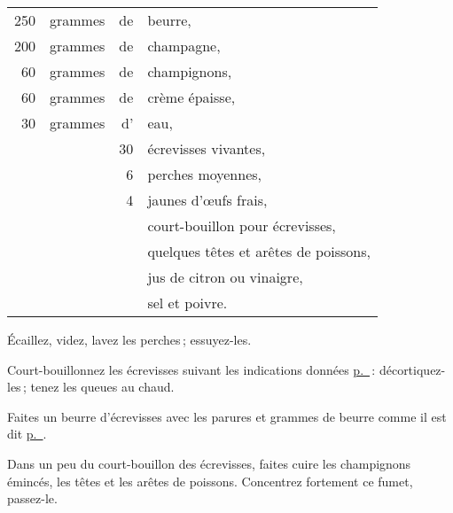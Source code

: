 \footnotesize
\begin{longtable}{rrrp{16em}}
    250 & grammes & de & beurre,                                                                          \\
    200 & grammes & de & champagne,                                                                       \\
     60 & grammes & de & champignons,                                                                     \\
     60 & grammes & de & crème épaisse,                                                                   \\
     30 & grammes & d' & eau,                                                                             \\
        &         & 30 & écrevisses vivantes,                                                             \\
        &         &  6 & perches moyennes,                                                                \\
        &         &  4 & jaunes d'œufs frais,                                                             \\
        &         &    & court-bouillon pour écrevisses,                                                  \\
        &         &    & quelques têtes et arêtes de poissons,                                            \\
        &         &    & jus de citron ou vinaigre,                                                       \\
        &         &    & sel et poivre.                                                                   \\
\end{longtable}
\normalsize

Écaillez, videz, lavez les perches ; essuyez-les.

Court-bouillonnez les écrevisses suivant les indications données
\hyperlink{p0287}{p. \pageref{pg0287}} : décortiquez-les ; tenez les queues au
chaud.

Faites un beurre d'écrevisses avec les parures et {\mmm} grammes de
beurre comme il est dit \hyperlink{p0287-3}{p. \pageref{pg0287-3}}.

Dans un peu du court-bouillon des écrevisses, faites cuire les champignons
émincés, les têtes et les arêtes de poissons. Concentrez fortement ce fumet,
passez-le.

